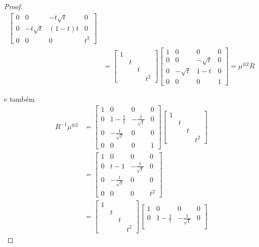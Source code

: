 \documentclass[a4paper,portuguese,11pt,twoside, leqno]{book}
\theoremstyle{definition}
\begin{document}
\begin{proof}
\begin{align*}
\begin{bmatrix}
		0 & 0 & -t\sqrt{t} & 0 \\
		0 & -t\sqrt{t} & (1-t)t &  0 \\
		0 & 0 & 0 & t^2
		\end{bmatrix} \\
		&= \begin{bmatrix}
		1 \\
		& t \\
		& & t \\
		& & & t^2
		\end{bmatrix}\begin{bmatrix}
		1 & 0 & 0 & 0 \\
		0 & 0 & -\sqrt{t} & 0 \\
		0 & -\sqrt{t} & 1-t & 0 \\
		0 & 0 & 0 & 1
		\end{bmatrix} 
		= \mu^{\otimes 2}R
		\end{align*}
		\par\vspace{0.3cm} e também
		\begin{align*}
		R^{-1}\mu^{\otimes 2} &= \begin{bmatrix}
		1 & 0 & 0 & 0 \\
		0 & 1 - \frac{1}{t} & -\frac{1}{\sqrt{t}} & 0 \\
		0 & -\frac{1}{\sqrt{t}} & 0 & 0 \\
		0 & 0 & 0 & 1
		\end{bmatrix}\begin{bmatrix}
		1 \\
		& t \\
		& & t \\
		& & & t^2
		\end{bmatrix} \\
		&= \begin{bmatrix}
		1 & 0 & 0 & 0 \\
		0 & t-1 & -\frac{t}{\sqrt{t}} & 0 \\
		0 & -\frac{t}{\sqrt{t}} & 0 &  0 \\
		0 & 0 & 0 & t^2
		\end{bmatrix} \\
		&= \begin{bmatrix}
		1 \\
		& t \\
		& & t \\
		& & & t^2
		\end{bmatrix}\begin{bmatrix}
		1 & 0 & 0 & 0 \\
		0 & 1 - \frac{1}{t} & -\frac{1}{\sqrt{t}} & 0 \\

\end{bmatrix}
\end{align*}
\end{proof}
\end{document}
